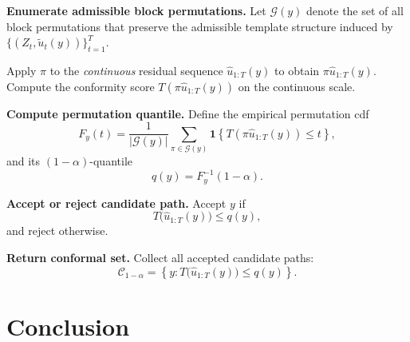 \documentclass{article}
\begin{document}
\begin{algorithm}[t]
\begin{algorithmic}[1]
\State \textbf{Enumerate admissible block permutations.}
Let $\mathcal G(y)$ denote the set of all block permutations that preserve the admissible template structure induced by $\{(Z_t,\tilde u_t(y))\}_{t=1}^T$.

    \State Apply $\pi$ to the \emph{continuous} residual sequence $\hat u_{1:T}(y)$ to obtain $\pi\hat u_{1:T}(y)$.
    \State Compute the conformity score $T(\pi\hat u_{1:T}(y))$ on the continuous scale.
\EndFor

\State \textbf{Compute permutation quantile.}
Define the empirical permutation cdf
\[
F_y(t)=\frac{1}{|\mathcal G(y)|}\sum_{\pi\in\mathcal G(y)}
\mathbf 1\!\left\{T(\pi\hat u_{1:T}(y))\le t\right\},
\]
and its $(1-\alpha)$-quantile
\[
q(y)=F_y^{-1}(1-\alpha).
\]

\State \textbf{Accept or reject candidate path.}
Accept $y$ if
\[
T\bigl(\hat u_{1:T}(y)\bigr)\le q(y),
\]
and reject otherwise.

\State \textbf{Return conformal set.}
Collect all accepted candidate paths:
\[
\mathcal C_{1-\alpha}
=
\left\{
y :
T\bigl(\hat u_{1:T}(y)\bigr)\le q(y)
\right\}.
\]
\end{algorithmic}
\end{algorithm}

\section{Conclusion}

\newpage



\end{document}
